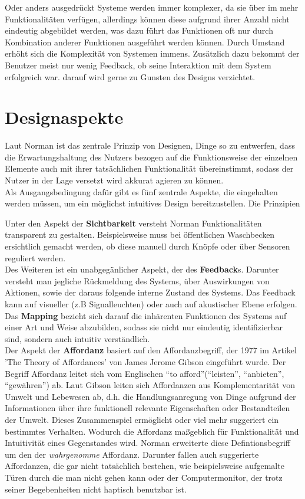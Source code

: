 \documentclass[parskip,headsepline, headtopline, %
footsepline, oneside, 12pt, headings=small]{scrreprt}
\begin{document}
Oder anders ausgedrückt Systeme werden immer komplexer, da sie über im mehr Funktionalitäten verfügen, allerdings können diese aufgrund ihrer Anzahl nicht eindeutig abgebildet werden, was dazu führt das Funktionen oft nur durch Kombination anderer Funktionen ausgeführt werden können. Durch Umstand erhöht sich die Komplexität von Systemen immens. Zusätzlich dazu bekommt der Benutzer meist nur wenig Feedback, ob seine Interaktion mit dem System erfolgreich war. darauf wird gerne zu Gunsten des Designs verzichtet. 


\section{Designaspekte}
\label{sec:aspekte}

Laut Norman ist das zentrale Prinzip von Designen, Dinge so zu entwerfen, dass die Erwartungshaltung des Nutzers bezogen auf die Funktionsweise der einzelnen Elemente auch mit ihrer tatsächlichen Funktionalität übereinstimmt, sodass der Nutzer in der Lage versetzt wird akkurat agieren zu können.\\ 
Als Ausgangsbedingung dafür gibt es fünf zentrale Aspekte, die eingehalten werden müssen, um  ein möglichst intuitives Design bereitzustellen. Die Prinzipien 
	
Unter den Aspekt der \textbf{Sichtbarkeit} versteht Norman Funktionalitäten transparent zu gestalten. Beispielsweise muss bei öffentlichen Waschbecken ersichtlich gemacht werden, ob diese manuell durch Knöpfe oder über Sensoren reguliert werden.\\
   
Des Weiteren ist ein unabgegänlicher Aspekt, der des \textbf{Feedback}s. Darunter versteht man jegliche Rückmeldung des Systems, über Auswirkungen von Aktionen, sowie der daraus folgende interne Zustand des Systems. Das Feedback kann auf visueller (z.B Signalleuchten) oder auch auf akustischer Ebene erfolgen.\\
 
Das	\textbf{Mapping} bezieht sich darauf die inhärenten Funktionen des Systems auf einer Art und Weise abzubilden, sodass sie nicht nur eindeutig identifizierbar sind, sondern auch intuitiv verständlich.\\

Der Aspekt der \textbf{Affordanz} basiert auf den Affordanzbegriff, der 1977 im Artikel 'The Theory of Affordances' von James Jerome Gibson eingeführt wurde. Der Begriff Affordanz leitet sich vom Englischen “to afford”(“leisten”, “anbieten”, “gewähren”) ab. Laut Gibson leiten sich Affordanzen aus Komplementarität von Umwelt und Lebewesen ab, d.h.  
die Handlungsanregung von Dinge aufgrund der Informationen über ihre funktionell relevante Eigenschaften oder Bestandteilen der Umwelt. Dieses Zusammenspiel ermöglicht oder viel mehr suggeriert ein bestimmtes Verhalten. Wodurch die Affordanz maßgeblich für Funktionalität und Intuitivität eines Gegenstandes wird.
Norman erweiterte diese Defintionsbegriff um den der \textit{wahrgenomme} Affordanz. Darunter fallen auch suggerierte Affordanzen, die gar nicht tatsächlich bestehen, wie beispielsweise aufgemalte Türen durch die man nicht gehen kann oder der Computermonitor, der trotz seiner Begebenheiten nicht haptisch benutzbar ist. 
\end{document}
